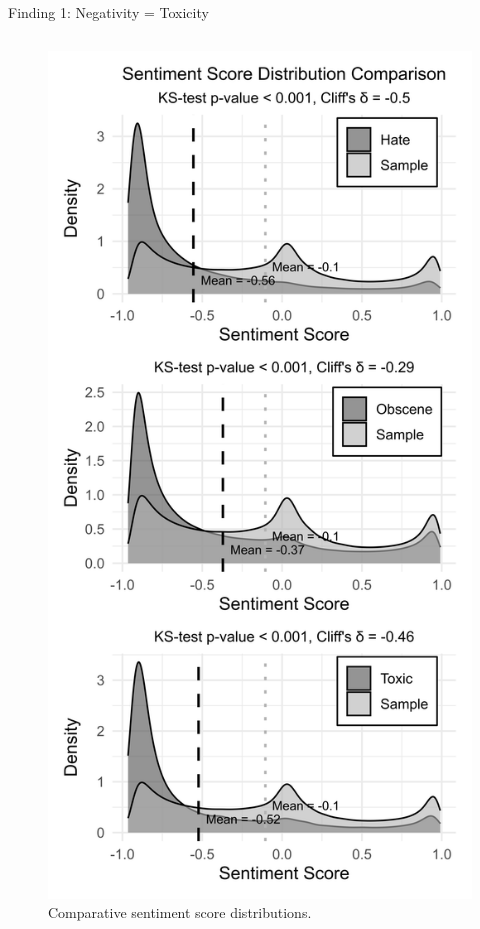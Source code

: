 \documentclass[10pt]{beamer}
\begin{document}
\begin{frame}{Finding 1: Negativity = Toxicity}
\begin{columns}
\begin{column}{0.33\textwidth}
\begin{figure}[t]
    \includegraphics[width=\columnwidth]{combined_density_plots_with_legend_600dpi.jpg}
    \caption{Comparative sentiment score distributions.}
    \label{fig:density_plots}
\end{figure}

\end{column}
\end{columns}
\end{frame}
\end{document}
